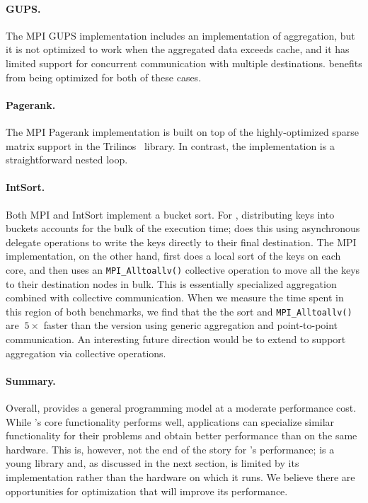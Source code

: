 \paragraph{GUPS.}
The MPI GUPS implementation includes an implementation of aggregation,
but it is not optimized to work when the aggregated data exceeds
cache, and it has limited support for concurrent communication with
multiple destinations. \Grappa benefits from being optimized for both
of these cases.

\paragraph{Pagerank.}
The MPI Pagerank implementation is built on top of the
highly-optimized sparse matrix support in the Trilinos~\cite{trilinos}
library. In contrast, the \Grappa implementation is a straightforward nested
loop.

\paragraph{IntSort.}
Both MPI and \Grappa IntSort implement a bucket sort. For \Grappa,
distributing keys into buckets accounts for the bulk of the execution
time; \Grappa does this using asynchronous delegate operations to
write the keys directly to their final destination. The MPI
implementation, on the other hand, first does a local sort of the keys
on each core, and then uses an \texttt{MPI\_Alltoallv()} collective
operation to move all the keys to their destination nodes in
bulk. This is essentially specialized aggregation combined with
collective communication. When we measure the time spent in this
region of both benchmarks, we find that the the sort and
\texttt{MPI\_Alltoallv()} are $~5\times$ faster than the \Grappa
version using generic aggregation and point-to-point communication. An
interesting future direction would be to extend \Grappa to support
aggregation via collective operations.


\paragraph{Summary.}

Overall, \Grappa provides a general programming model at a moderate
performance cost. While \Grappa's core functionality performs well,
applications can specialize similar functionality for their problems
and obtain better performance than \Grappa on the same hardware. This
is, however, not the end of the story for \Grappa's performance;
\Grappa is a young library and, as discussed in the next section, is
limited by its implementation rather than the hardware on which it
runs. We believe there are opportunities for optimization that will
improve its performance.

